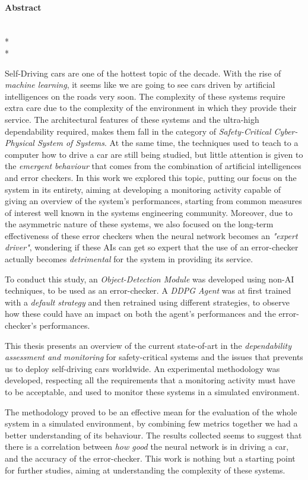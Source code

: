 \paragraph{Abstract}\mbox{}\\*\\*

Self-Driving cars are one of the hottest topic of the decade. With the rise of \textsl{machine learning}, it seems like we are going to see cars driven by artificial intelligences on the roads very soon. The complexity of these systems require extra care due to the complexity of the environment in which they provide their service. The architectural features of these systems and the ultra-high dependability required, makes them fall in the category of \textsl{Safety-Critical Cyber-Physical System of Systems}.
At the same time, the techniques used to teach to a computer how to drive a car are still being studied, but little attention is given to the \textsl{emergent behaviour} that comes from the combination of artificial intelligences and error checkers.
In this work we explored this topic, putting our focus on the system in its entirety, aiming at developing a monitoring activity capable of giving an overview of the system's performances, starting from common measures of interest well known in the systems engineering community.
Moreover, due to the asymmetric nature of these systems, we also focused on the long-term effectiveness of these error checkers when the neural network becomes an \textsl{"expert driver"}, wondering if these AIs can get so expert that the use of an error-checker actually becomes \textsl{detrimental} for the system in providing its service.

To conduct this study, an \textsl{Object-Detection Module} was developed using non-AI techniques, to be used as an error-checker. A \textsl{DDPG Agent} was at first trained with a \textsl{default strategy} and then retrained using different strategies, to observe how these could have an impact on both the agent's performances and the error-checker's performances.

This thesis presents an overview of the current state-of-art in the \textsl{dependability assessment and monitoring} for safety-critical systems and the issues that prevents us to deploy self-driving cars worldwide. An experimental methodology was developed, respecting all the requirements that a monitoring activity must have to be acceptable, and used to monitor these systems in a simulated environment.

The methodology proved to be an effective mean for the evaluation of the whole system in a simulated environment, by combining few metrics together we had a better understanding of its behaviour. The results collected seems to suggest that there is a correlation between \textsl{how good} the neural network is in driving a car, and the accuracy of the error-checker.
This work is nothing but a starting point for further studies, aiming at understanding the complexity of these systems.